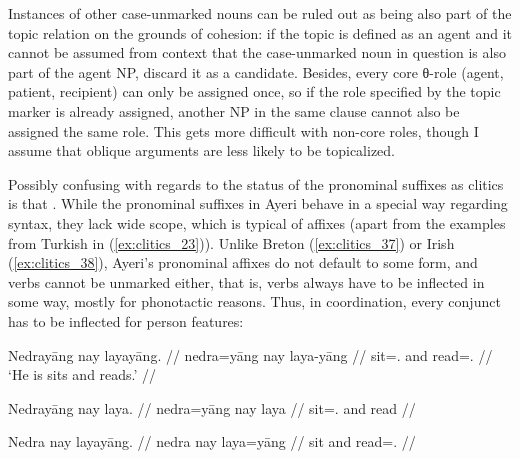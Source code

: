 \ex\label{ex:clitics_46}
\xe

Instances of other case-unmarked nouns can be ruled out as being also part of
the topic relation on the grounds of cohesion: if the topic is defined as an
agent and it cannot be assumed from context that the case-unmarked noun in
question is also part of the agent NP, discard it as a candidate. Besides,
every core θ-role (agent, patient, recipient) can only be assigned once, so if
the role specified by the topic marker is already assigned, another NP in the
same clause cannot also be assigned the same role. This gets more difficult
with non-core roles, though I assume that oblique arguments are less likely to
be topicalized.

Possibly confusing with regards to the status of the pronominal suffixes as
clitics is that .
While the pronominal suffixes in Ayeri behave in a special way regarding
syntax, they lack wide scope, which is typical of affixes (apart from the
examples from Turkish in (\ref{ex:clitics_23})). Unlike Breton
(\ref{ex:clitics_37}) or Irish (\ref{ex:clitics_38}), Ayeri's pronominal
affixes do not default to some form, and verbs cannot be unmarked either, that
is, verbs always have to be inflected in some way, mostly for phonotactic
reasons. Thus, in coordination, every conjunct has to be inflected for person
features:

\pex\label{ex:clitics_47}
\a\label{ex:clitics_47a}\begingl
	\gla Nedrayāng nay layayāng. //
	\glb nedra=yāng nay laya-yāng //
	\glc sit=\TsgM{}.\Aarg{} and read=\TsgM{}.\Aarg{} //
	\glft `He is sits and reads.' //
\endgl

\a\label{ex:clitics_47b}\ljudge{*}\begingl
	\gla Nedrayāng nay laya. //
	\glb nedra=yāng nay laya //
	\glc sit=\TsgM{}.\Aarg{} and read //
\endgl

\a\label{ex:clitics_47c}\ljudge{*}\begingl
	\gla Nedra nay layayāng. //
	\glb nedra nay laya=yāng //
	\glc sit and read=\TsgM{}.\Aarg{} //
\endgl
\xe

